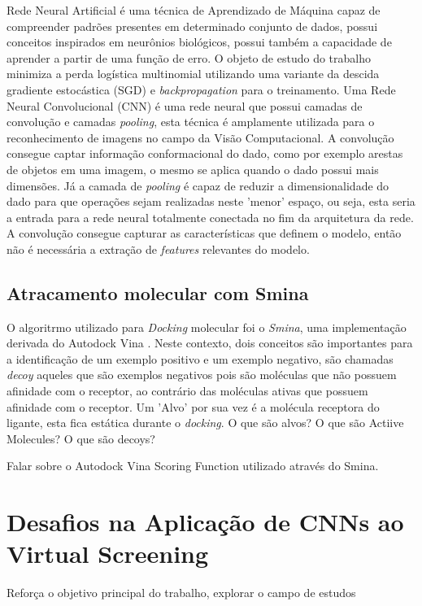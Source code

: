 \documentclass[utf8]{frontiersSCNS} %
\begin{document}
Rede Neural Artificial \cite{neural_networks} é uma técnica de Aprendizado de Máquina capaz de compreender padrões presentes em determinado conjunto de dados, possui conceitos inspirados em neurônios biológicos, possui também a capacidade de aprender a partir de uma função de erro. O objeto de estudo do trabalho minimiza a perda logística multinomial utilizando uma variante da descida gradiente estocástica (SGD) e \textit{backpropagation} para o treinamento. Uma Rede Neural Convolucional (CNN) \cite{lecun2015deep} é uma rede neural que possui camadas de convolução e camadas \textit{pooling}, esta técnica é amplamente utilizada para o reconhecimento de imagens no campo da Visão Computacional\cite{lecun2015deep}. A convolução consegue captar informação conformacional do dado, como por exemplo arestas de objetos em uma imagem, o mesmo se aplica quando o dado possui mais dimensões. Já a camada de \textit{pooling} é capaz de reduzir a dimensionalidade do dado para que operações sejam realizadas neste 'menor' espaço, ou seja, esta seria a entrada para a rede neural totalmente conectada no fim da arquitetura da rede. A convolução consegue capturar as características que definem o modelo, então não é necessária a extração de \textit{features} relevantes do modelo.

\subsection{Atracamento molecular com Smina}

O algoritrmo utilizado para \textit{Docking} molecular foi o \textit{Smina}\cite{smina}, uma implementação derivada do Autodock Vina \cite{Trott2010AutoDockVina}. Neste contexto, dois conceitos são importantes para a identificação de um exemplo positivo e um exemplo negativo, são chamadas \textit{decoy} aqueles que são exemplos negativos pois são moléculas que não possuem afinidade com o receptor, ao contrário das moléculas ativas que possuem afinidade com o receptor. Um 'Alvo' por sua vez é a molécula receptora do ligante, esta fica estática durante o \textit{docking}.
O que são alvos?
O que são Actiive Molecules?
O que são decoys?



Falar sobre o Autodock Vina Scoring Function utilizado através do Smina.


\section{Desafios na Aplicação de CNNs ao Virtual Screening} %
Reforça o objetivo principal do trabalho, explorar o campo de estudos
\end{document}
